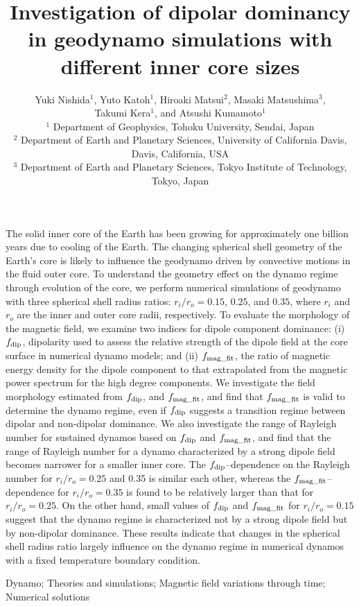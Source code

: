 \documentclass[mreferee]{gji}
\title[Dipolar dominancy in geodynamo with different inner core sizes]
{Investigation of dipolar dominancy in geodynamo simulations with different inner core sizes}
\author[Y. Nishida et al.]
{Yuki Nishida$^1$, Yuto Katoh$^1$, Hiroaki Matsui$^2$, Masaki Matsushima$^3$,\\
Takumi Kera$^1$, and Atsushi Kumamoto$^1$ \\
  $^1$ Department of Geophysics, Tohoku University, Sendai, Japan \\
  $^2$ Department of Earth and Planetary Sciences, University of California Davis, Davis, California, USA \\
  $^3$ Department of Earth and Planetary Sciences, Tokyo Institute of Technology, Tokyo, Japan
  }
\date{ }
\begin{document}
\maketitle
%
\begin{summary}
The solid inner core of the Earth has been growing for approximately one billion years due to cooling of the Earth.
The changing spherical shell geometry of the Earth’s core is likely to influence the geodynamo driven by convective motions in the fluid outer core.
To understand the geometry effect on the dynamo regime through evolution of the core, we perform numerical simulations of geodynamo with three spherical shell radius ratios: $r_{i}/r_{o} = 0.15$, $0.25$, and $0.35$, where $r_{i}$ and $r_{o}$ are the inner and outer core radii, respectively.
To evaluate the morphology of the magnetic field, we examine two indices for dipole component dominance: (i) $f_{\rm dip}$, dipolarity used to assess the relative strength of the dipole field at the core surface in numerical dynamo models; and (ii) $f_{\rm mag\_fit}$, the ratio of magnetic energy density for the dipole component to that extrapolated from the magnetic power spectrum for the high degree components.
We investigate the field morphology estimated from $f_{\rm dip}$, and $f_{\rm mag\_fit}$, and find that $f_{\rm mag\_fit}$ is valid to determine the dynamo regime, even if $f_{\rm dip}$ suggests a transition regime between dipolar and non-dipolar dominance.
We also investigate the range of Rayleigh number for sustained dynamos based on $f_{\rm dip}$ and $f_{\rm mag\_fit}$, and find that the range of Rayleigh number for a dynamo characterized by a strong dipole field becomes narrower for a smaller inner core.
The $f_{\rm dip}$–dependence on the Rayleigh number for $r_{i}/r_{o} = 0.25$ and 0.35 is similar each other, whereas the $f_{\rm mag\_fit}$–dependence for $r_{i}/r_{o} = 0.35$ is found to be relatively larger than that for $r_{i}/r_{o} = 0.25$. On the other hand, small values of  $f_{\rm dip}$ and  $f_{\rm mag\_fit}$ for $r_{i}/r_{o} = 0.15$ suggest that the dynamo regime is characterized not by a strong dipole field but by non-dipolar dominance.
These results indicate that changes in the spherical shell radius ratio largely influence on the dynamo regime in numerical dynamos with a fixed temperature boundary condition.
\end{summary}
%
\begin{keywords}
Dynamo; Theories and simulations; Magnetic field variations through time; Numerical solutions
\end{keywords}
%

%

%

%

%

%

%
\end{document}
